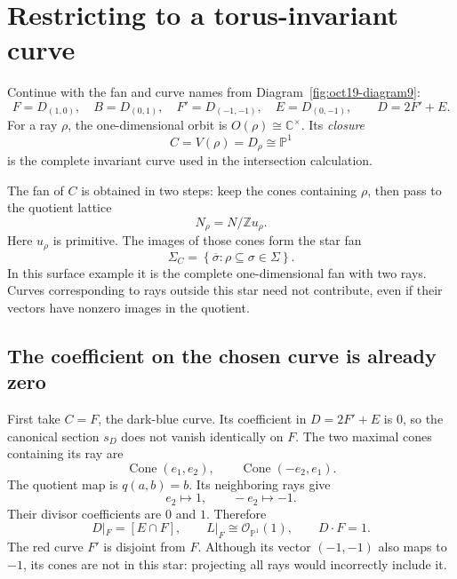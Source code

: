 \documentclass[11pt]{article}
\theoremstyle{definition}
\theoremstyle{remark}
\DeclareMathOperator{\Cone}{Cone}
\newcommand{\Sg}{\Sigma}
\newcommand{\cO}{\mathcal{O}}
\newcommand{\set}[1]{\left\{#1\right\}}
\newcommand{\bP}{\mathbb{P}}
\newcommand{\bZ}{\mathbb{Z}}
\newcommand{\bC}{\mathbb{C}}
\newcommand{\isom}{\cong}
\begin{document}
\section{Restricting to a torus-invariant curve}

Continue with the fan and curve names from Diagram~\ref{fig:oct19-diagram9}:
\[
    F=D_{(1,0)},\quad B=D_{(0,1)},\quad
    F'=D_{(-1,-1)},\quad E=D_{(0,-1)},\qquad D=2F'+E.
\]
For a ray \(\rho\), the one-dimensional orbit is
\(O(\rho)\isom\bC^\times\). Its \emph{closure}
\[
    C=V(\rho)=D_\rho\isom\bP^1
\]
is the complete invariant curve used in the intersection calculation.

The fan of \(C\) is obtained in two steps: keep the cones containing
\(\rho\), then pass to the quotient lattice
\[
    N_\rho=N/\bZ u_\rho.
\]
Here \(u_\rho\) is primitive. The images of those cones form the
star fan
\[
    \Sigma_C=
    \set{\overline{\sigma}:\rho\subseteq\sigma\in\Sg}.
\]
In this surface example it is the complete one-dimensional fan with
two rays. Curves corresponding to rays outside this star need not
contribute, even if their vectors have nonzero images in the quotient.

\subsection{The coefficient on the chosen curve is already zero}

First take \(C=F\), the dark-blue curve. Its coefficient in
\(D=2F'+E\) is \(0\), so the canonical section \(s_D\) does not
vanish identically on \(F\). The two maximal cones containing its ray
are
\[
    \Cone(e_1,e_2),\qquad \Cone(-e_2,e_1).
\]
The quotient map is \(q(a,b)=b\). Its neighboring rays give
\[
    e_2\longmapsto1,\qquad -e_2\longmapsto-1.
\]
Their divisor coefficients are \(0\) and \(1\). Therefore
\[
    D|_F=[E\cap F],\qquad
    L|_F\isom\cO_{\bP^1}(1),\qquad D\cdot F=1.
\]
The red curve \(F'\) is disjoint from \(F\). Although its vector
\((-1,-1)\) also maps to \(-1\), its cones are not in this star:
projecting all rays would incorrectly include it.
\end{document}
